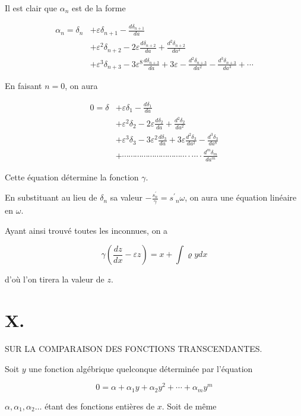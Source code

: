 \documentclass{article}
\begin{document}
Il est clair que \(\alpha_{n}\) est de la forme

\[
\begin{aligned}
\alpha_{n}=\delta_{n} & +\varepsilon \delta_{n+1}-\frac{d \delta_{n+1}}{d a} \\
& +\varepsilon^{2} \delta_{n+2}-2 \varepsilon \frac{d \delta_{n+2}}{d a}+\frac{d^{2} \delta_{n+2}}{d a^{2}} \\
& +\varepsilon^{3} \delta_{n+3}-3 \varepsilon^{8} \frac{d \delta_{n+3}}{d a}+3 \varepsilon-\frac{d^{2} \delta_{n+3}}{d a^{2}}-\frac{d^{3} \delta_{n+3}}{d a^{3}}+\cdots
\end{aligned}
\]

En faisant \(n=0\), on aura

\[
\begin{aligned}
0=\delta & +\varepsilon \delta_{1}-\frac{d \delta_{1}}{d a} \\
& +\varepsilon^{2} \delta_{2}-2 \varepsilon \frac{d \delta_{2}}{d a}+\frac{d^{2} \delta_{2}}{d a^{2}} \\
& +\varepsilon^{3} \delta_{3}-3 \varepsilon^{2} \frac{d \delta_{3}}{d a}+3 \varepsilon \frac{d^{2} \delta_{3}}{d a^{2}}-\frac{d^{3} \delta_{3}}{d a^{8}} \\
& +\cdots \cdots \cdots \cdots \cdots \cdots \cdots \cdots \cdots \cdots \cdot \cdots \cdot \frac{d^{m} \delta_{m}}{d a^{m}}
\end{aligned}
\]

Cette équation détermine la fonction \(\gamma\).

En substituant au lieu de \(\delta_{n}\) sa valeur \(-\frac{s_{n}^{\prime}}{\gamma}=s^{\prime}{ }_{n} \omega\), on aura une équation linéaire en \(\omega\).

Ayant ainsi trouvé toutes les inconnues, on a

\[
\gamma\left(\frac{d z}{d x}-\varepsilon z\right)=x+\int \varrho y d x
\]

d'où l'on tirera la valeur de \(z\).

\section*{X.}

SUR LA COMPARAISON DES FONCTIONS TRANSCENDANTES.

Soit \(y\) une fonction algébrique quelconque déterminée par l'équation

\[
0=\alpha+\alpha_{1} y+\alpha_{2} y^{2}+\cdots+\alpha_{m} y^{m}
\]

\(\alpha, \alpha_{1}, \alpha_{2} \ldots\) étant des fonctions entières de \(x\). Soit de même
\end{document}
